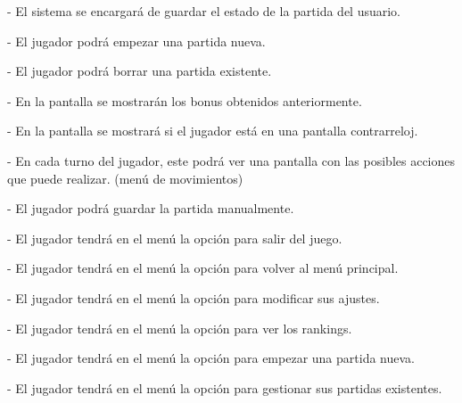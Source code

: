 -	El sistema se encargará de guardar el estado de la partida del usuario.

-	El jugador podrá empezar una partida nueva.

-	El jugador podrá borrar una partida existente.

-	En la pantalla se mostrarán los bonus obtenidos anteriormente.

-	En la pantalla se mostrará si el jugador está en una pantalla contrarreloj.

-	En cada turno del jugador, este podrá ver una pantalla con las posibles acciones que puede realizar. (menú de movimientos)

-	El jugador podrá guardar la partida manualmente.

-	El jugador tendrá en el menú la opción para salir del juego.

-	El jugador tendrá en el menú la opción para volver al menú principal.

-	El jugador tendrá en el menú la opción para modificar sus ajustes.

-	El jugador tendrá en el menú la opción para ver los rankings.

-	El jugador tendrá en el menú la opción para empezar una partida nueva.

-	El jugador tendrá en el menú la opción para gestionar sus partidas existentes.

